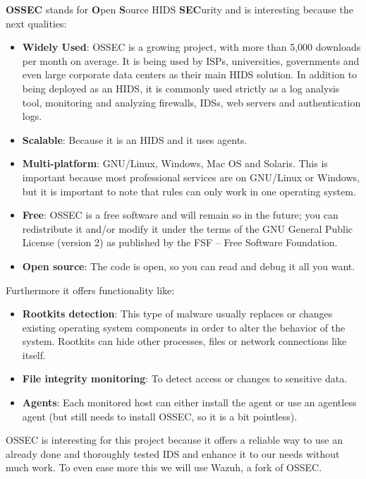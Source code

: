 \linej
\textbf{OSSEC} stands for \textbf{O}pen \textbf{S}ource HIDS \textbf{SEC}urity and is interesting because the next qualities\cite{ossec}:
\begin{itemize}
	\item \textbf{Widely Used}: OSSEC is a growing project, with more than 5,000 downloads per month on average. It is being used by ISPs, universities, governments and even large corporate data centers as their main HIDS solution. In addition to being deployed as an HIDS, it is commonly used strictly as a log analysis tool, monitoring and analyzing firewalls, IDSs, web servers and authentication logs.
	\item \textbf{Scalable}: Because it is an HIDS and it uses agents.
	\item \textbf{Multi-platform}: GNU/Linux, Windows, Mac OS and Solaris. This is important because most professional services are on GNU/Linux or Windows, but it is important to note that rules can only work in one operating system.
	\item \textbf{Free}: OSSEC is a free software and will remain so in the future; you can redistribute it and/or modify it under the terms of the GNU General Public License (version 2) as published by the FSF -- Free Software Foundation.
	\item \textbf{Open source}: The code is open, so you can read and debug it all you want.
\end{itemize}

\linej
Furthermore it offers functionality like\cite{wazuh_additional_functionality}:
\begin{itemize}
	\item \textbf{Rootkits detection}: This type of malware usually replaces or changes existing operating system components in order to alter the behavior of the system. Rootkits can hide other processes, files or network connections like itself.
	\item \textbf{File integrity monitoring}: To detect access or changes to sensitive data.
	\item \textbf{Agents}: Each monitored host can either install the agent or use an agentless agent\cite{agentless} (but still needs to install OSSEC, so it is a bit pointless).
\end{itemize}

\linej
OSSEC is interesting for this project because it offers a reliable way to use an already done and thoroughly tested IDS and enhance it to our needs without much work. To even ease more this we will use Wazuh, a fork of OSSEC.


